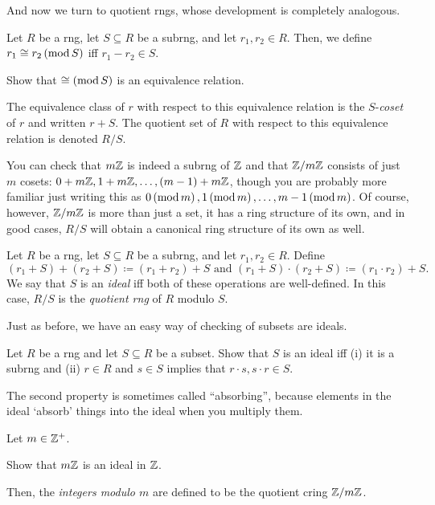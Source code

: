 And now we turn to quotient rngs, whose development is completely analogous.
\begin{dfn}
Let $R$ be a rng, let $S\subseteq R$ be a subrng, and let $r_1,r_2\in R$.  Then, we define $r_1\cong r_2\left( \mathrm{mod}\, S\right)$ iff $r_1-r_2\in S$.
\begin{exr}
Show that $\cong \left( \mathrm{mod}\, S\right)$ is an equivalence relation.
\end{exr}
The equivalence class of $r$ with respect to this equivalence relation is the $S$-\emph{coset} of $r$ and written $r+S$.  The quotient set of $R$ with respect to this equivalence relation is denoted $R/S$.
\end{dfn}
You can check that $m\mathbb{Z}$ is indeed a subrng of $\mathbb{Z}$ and that $\mathbb{Z} /m\mathbb{Z}$ consists of just $m$ cosets:  $0+m\mathbb{Z} ,1+m\mathbb{Z} ,\ldots ,(m-1)+m\mathbb{Z}$, though you are probably more familiar just writing this as $0\left( \mathrm{mod}\, m\right),1\left( \mathrm{mod}\, m\right),\ldots ,m-1\left( \mathrm{mod}\, m\right)$.  Of course, however, $\mathbb{Z} /m\mathbb{Z}$ is more than just a set, it has a ring structure of its own, and in good cases, $R/S$ will obtain a canonical ring structure of its own as well.
\begin{dfn}\label{IdealsAndQuotientRngs}
Let $R$ be a rng, let $S\subseteq R$ be a subrng, and let $r_1,r_2\in R$.  Define
\begin{equation}
(r_1+S)+(r_2+S)\coloneqq (r_1+r_2)+S\text{ and }(r_1+S)\cdot (r_2+S)\coloneqq (r_1\cdot r_2)+S.
\end{equation}
We say that $S$ is an \emph{ideal} iff both of these operations are well-defined.  In this case, $R/S$ is the \emph{quotient rng} of $R$ modulo $S$.
\end{dfn}
Just as before, we have an easy way of checking of subsets are ideals.
\begin{exr}
Let $R$ be a rng and let $S\subseteq R$ be a subset.  Show that $S$ is an ideal iff (i) it is a subrng and (ii) $r\in R$ and $s\in S$ implies that $r\cdot s,s\cdot r\in S$.
\begin{rmk}
The second property is sometimes called ``absorbing'', because elements in the ideal `absorb' things into the ideal when you multiply them.
\end{rmk}
\end{exr}
\begin{exm}\label{exmA.1.117}
Let $m\in \mathbb{Z} ^+$.
\begin{exr}
Show that $m\mathbb{Z}$ is an ideal in $\mathbb{Z}$.
\end{exr}
Then, the \emph{integers modulo $m$} are defined to be the quotient cring $\mathbb{Z} /m\mathbb{Z}$.
\end{exm}

